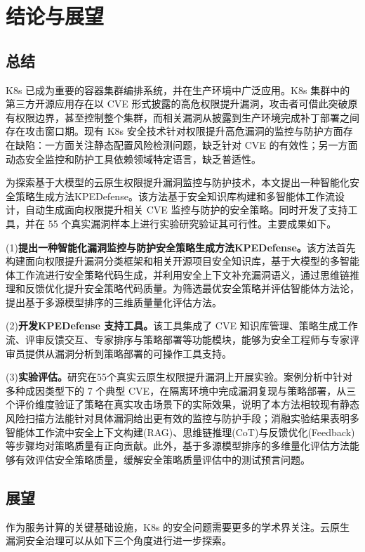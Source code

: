 
\chapter{结论与展望}\label{chap:conclusion}

\section{总结}
K8s 已成为重要的容器集群编排系统，并在生产环境中广泛应用。K8s 集群中的第三方开源应用存在以 CVE 形式披露的高危权限提升漏洞，攻击者可借此突破原有权限边界，甚至控制整个集群，而相关漏洞从披露到生产环境完成补丁部署之间存在攻击窗口期。现有 K8s 安全技术针对权限提升高危漏洞的监控与防护方面存在缺陷：一方面关注静态配置风险检测问题，缺乏针对 CVE 的有效性；另一方面动态安全监控和防护工具依赖领域特定语言，缺乏普适性。

为探索基于大模型的云原生权限提升漏洞监控与防护技术，本文提出一种智能化安全策略生成方法KPEDefense。该方法基于安全知识库构建和多智能体工作流设计，自动生成面向权限提升相关 CVE 监控与防护的安全策略。同时开发了支持工具，并在 55 个真实漏洞样本上进行实验研究验证其可行性。主要成果如下。

(1)\textbf{提出一种智能化漏洞监控与防护安全策略生成方法KPEDefense。}该方法首先构建面向权限提升漏洞分类框架和相关开源项目安全知识库，基于大模型的多智能体工作流进行安全策略代码生成，并利用安全上下文补充漏洞语义，通过思维链推理和反馈优化提升安全策略代码质量。为筛选最优安全策略并评估智能体方法论，提出基于多源模型排序的三维质量量化评估方法。

(2)\textbf{开发KPEDefense 支持工具。}该工具集成了 CVE 知识库管理、策略生成工作流、评审反馈交互、专家排序与策略部署等功能模块，能够为安全工程师与专家评审员提供从漏洞分析到策略部署的可操作工具支持。

(3)\textbf{实验评估。}研究在55个真实云原生权限提升漏洞上开展实验。案例分析中针对多种成因类型下的 7 个典型 CVE，在隔离环境中完成漏洞复现与策略部署，从三个评价维度验证了策略在真实攻击场景下的实际效果，说明了本方法相较现有静态风险扫描方法能针对具体漏洞给出更有效的监控与防护手段；消融实验结果表明多智能体工作流中安全上下文构建(RAG)、思维链推理(CoT)与反馈优化(Feedback)等步骤均对策略质量有正向贡献。此外，基于多源模型排序的多维量化评估方法能够有效评估安全策略质量，缓解安全策略质量评估中的测试预言问题。

\section{展望}

作为服务计算的关键基础设施，K8s 的安全问题需要更多的学术界关注。云原生漏洞安全治理可以从如下三个角度进行进一步探索。

